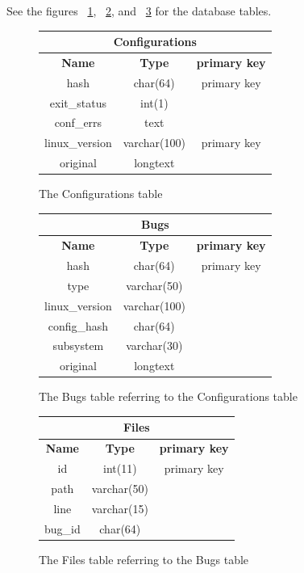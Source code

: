 \documentclass[a4paper,11pt]{article}
\newcommand{\figa}{
    \begin{figure}[!htpb]
    \centering
}
\newcommand{\figb}[2]{
    \caption{#1}
    \label{#2}
    \end{figure}
}
\begin{document}
See the figures ~\ref{fig:conftable}, ~\ref{fig:bugstable}, and 
~\ref{fig:filestable} for the database tables.


\figa
    \begin{tabular}{c|c|c}
        \hline 
        \hline
        \multicolumn{3}{c}{\textbf{Configurations}} \\
        \hline
        \textbf{Name} & \textbf{Type} &\textbf{primary key} \\
        \hline
        hash & char(64) & primary key \\
        exit\_status & int(1) \\
        conf\_errs & text \\
        linux\_version & varchar(100) & primary key \\
        original & longtext \\
        \hline
        \hline
    \end{tabular}
\figb{The Configurations table}{fig:conftable}

\figa
    \begin{tabular}{c|c|c}
        \hline
        \hline
        \multicolumn{3}{c}{\textbf{Bugs}} \\
        \hline
        \textbf{Name} & \textbf{Type} &\textbf{primary key} \\
        \hline
        hash & char(64) & primary key \\
        type & varchar(50) \\
        linux\_version & varchar(100) \\
        config\_hash & char(64) \\
        subsystem & varchar(30) \\
        original & longtext \\
        \hline
        \hline
    \end{tabular}
\figb{The Bugs table referring to the Configurations table}{fig:bugstable}

\figa
    \begin{tabular}{c|c|c}
        \hline
        \hline
        \multicolumn{3}{c}{\textbf{Files}} \\
        \hline
        \textbf{Name} & \textbf{Type} &\textbf{primary key} \\
        \hline
        id & int(11) & primary key \\
        path & varchar(50) \\
        line & varchar(15) \\
        bug\_id & char(64) \\
        \hline
        \hline
    \end{tabular}
\figb{The Files table referring to the Bugs table}{fig:filestable}
\end{document}
